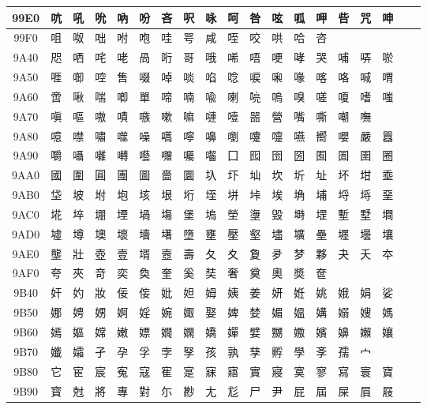 \begin{table}[H]
\begin{tabular}{|Sc|*{16}{>{\centering\arraybackslash}p{1em}|}>{\centering\arraybackslash}p{2.5em}|}
99E0 & 吭 & 吼 & 吮 & 吶 & 吩 & 吝 & 呎 & 咏 & 呵 & 咎 & 呟 & 呱 & 呷 & 呰 & 咒 & 呻 \\ \hline
99F0 & 咀 & 呶 & 咄 & 咐 & 咆 & 哇 & 咢 & 咸 & 咥 & 咬 & 哄 & 哈 & 咨 & & & \\ \hline
9A40 & 咫 & 哂 & 咤 & 咾 & 咼 & 哘 & 哥 & 哦 & 唏 & 唔 & 哽 & 哮 & 哭 & 哺 & 哢 & 唹 \\ \hline
9A50 & 啀 & 啣 & 啌 & 售 & 啜 & 啅 & 啖 & 啗 & 唸 & 唳 & 啝 & 喙 & 喀 & 咯 & 喊 & 喟 \\ \hline
9A60 & 啻 & 啾 & 喘 & 喞 & 單 & 啼 & 喃 & 喩 & 喇 & 喨 & 嗚 & 嗅 & 嗟 & 嗄 & 嗜 & 嗤 \\ \hline
9A70 & 嗔 & 嘔 & 嗷 & 嘖 & 嗾 & 嗽 & 嘛 & 嗹 & 噎 & 噐 & 營 & 嘴 & 嘶 & 嘲 & 嘸 & \\ \hline
9A80 & 噫 & 噤 & 嘯 & 噬 & 噪 & 嚆 & 嚀 & 嚊 & 嚠 & 嚔 & 嚏 & 嚥 & 嚮 & 嚶 & 嚴 & 囂 \\ \hline
9A90 & 嚼 & 囁 & 囃 & 囀 & 囈 & 囎 & 囑 & 囓 & 囗 & 囮 & 囹 & 圀 & 囿 & 圄 & 圉 & 圈 \\ \hline
9AA0 & 國 & 圍 & 圓 & 團 & 圖 & 嗇 & 圜 & 圦 & 圷 & 圸 & 坎 & 圻 & 址 & 坏 & 坩 & 埀 \\ \hline
9AB0 & 垈 & 坡 & 坿 & 垉 & 垓 & 垠 & 垳 & 垤 & 垪 & 垰 & 埃 & 埆 & 埔 & 埒 & 埓 & 堊 \\ \hline
9AC0 & 埖 & 埣 & 堋 & 堙 & 堝 & 塲 & 堡 & 塢 & 塋 & 塰 & 毀 & 塒 & 堽 & 塹 & 墅 & 墹 \\ \hline
9AD0 & 墟 & 墫 & 墺 & 壞 & 墻 & 墸 & 墮 & 壅 & 壓 & 壑 & 壗 & 壙 & 壘 & 壥 & 壜 & 壤 \\ \hline
9AE0 & 壟 & 壯 & 壺 & 壹 & 壻 & 壼 & 壽 & 夂 & 夊 & 夐 & 夛 & 梦 & 夥 & 夬 & 夭 & 夲 \\ \hline
9AF0 & 夸 & 夾 & 竒 & 奕 & 奐 & 奎 & 奚 & 奘 & 奢 & 奠 & 奧 & 奬 & 奩 & & & \\ \hline
9B40 & 奸 & 妁 & 妝 & 佞 & 侫 & 妣 & 妲 & 姆 & 姨 & 姜 & 妍 & 姙 & 姚 & 娥 & 娟 & 娑 \\ \hline
9B50 & 娜 & 娉 & 娚 & 婀 & 婬 & 婉 & 娵 & 娶 & 婢 & 婪 & 媚 & 媼 & 媾 & 嫋 & 嫂 & 媽 \\ \hline
9B60 & 嫣 & 嫗 & 嫦 & 嫩 & 嫖 & 嫺 & 嫻 & 嬌 & 嬋 & 嬖 & 嬲 & 嫐 & 嬪 & 嬶 & 嬾 & 孃 \\ \hline
9B70 & 孅 & 孀 & 孑 & 孕 & 孚 & 孛 & 孥 & 孩 & 孰 & 孳 & 孵 & 學 & 斈 & 孺 & 宀 & \\ \hline
9B80 & 它 & 宦 & 宸 & 寃 & 寇 & 寉 & 寔 & 寐 & 寤 & 實 & 寢 & 寞 & 寥 & 寫 & 寰 & 寶 \\ \hline
9B90 & 寳 & 尅 & 將 & 專 & 對 & 尓 & 尠 & 尢 & 尨 & 尸 & 尹 & 屁 & 屆 & 屎 & 屓 & 屐 \\ \hline

\end{tabular}
\end{table}
